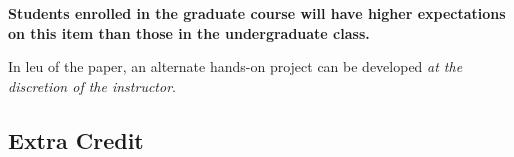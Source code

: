\documentclass[12pt]{scrartcl}
\begin{document}
\textbf{Students enrolled in the graduate course will have higher expectations on this item than those in the undergraduate class.}

In leu of the paper, an alternate hands-on project can be developed \textit{at the discretion of the instructor}. 

%

\subsection{Extra Credit}
%
\end{document}
